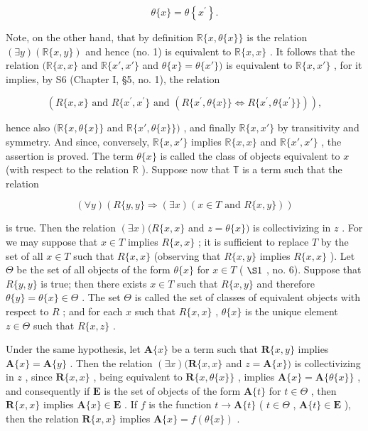\[
\theta \{x \} = \theta \left\{x ^ {\prime} \right\}.
\]

Note, on the other hand, that by definition \(\mathbb{R}\{x, \theta\{x\}\}\) is the relation \((\exists y)(\mathbb{R}\{x, y\})\) and hence (no. 1) is equivalent to \(\mathbb{R}\{x, x\}\) . It follows that the relation \((\mathbb{R}\{x, x\}\) and \(\mathbb{R}\{x', x'\}\) and \(\theta\{x\} = \theta\{x'\})\) is equivalent to \(\mathbb{R}\{x, x'\}\) , for it implies, by S6 (Chapter I, §5, no. 1), the relation

\[
(R \{x, x \} \text {   and   } R \{x ^ {\prime}, x ^ {\prime} \} \text {   and   } (R \{x ^ {\prime}, \theta \{x \} \} \iff R \{x ^ {\prime}, \theta \{x ^ {\prime} \} \})),
\]

hence also \((\mathbb{R}\{x, \theta\{x\}\}\) and \(\mathbb{R}\{x', \theta\{x\}\})\) , and finally \(\mathbb{R}\{x, x'\}\) by transitivity and symmetry. And since, conversely, \(\mathbb{R}\{x, x'\}\) implies \(\mathbb{R}\{x, x\}\) and \(\mathbb{R}\{x', x'\}\) , the assertion is proved. The term \(\theta\{x\}\) is called the class of objects equivalent to \(x\) (with respect to the relation \(\mathbb{R}\) ). Suppose now that \(\mathbb{T}\) is a term such that the relation

\[
(\forall y) (R \{y, y \} \Longrightarrow (\exists x) (x \in T \text {   and   } R \{x, y \}))\tag{1}
\]

is true. Then the relation \((\exists x)(R\{x, x\}\) and \(z = \theta\{x\})\) is collectivizing in \(z\) . For we may suppose that \(x \in T\) implies \(R\{x, x\}\) ; it is sufficient to replace \(T\) by the set of all \(x \in T\) such that \(R\{x, x\}\) (observing that \(R\{x, y\}\) implies \(R\{x, x\}\) ). Let \(\Theta\) be the set of all objects of the form \(\theta\{x\}\) for \(x \in T\) ( \(\S 1\) , no. 6). Suppose that \(R\{y, y\}\) is true; then there exists \(x \in T\) such that \(R\{x, y\}\) and therefore \(\theta\{y\} = \theta\{x\} \in \Theta\) . The set \(\Theta\) is called the set of classes of equivalent objects with respect to \(R\) ; and for each \(x\) such that \(R\{x, x\}\) , \(\theta\{x\}\) is the unique element \(z \in \Theta\) such that \(R\{x, z\}\) .

Under the same hypothesis, let \(\mathbf{A}\{x\}\) be a term such that \(\mathbf{R}\{x,y\}\) implies \(\mathbf{A}\{x\} = \mathbf{A}\{y\}\) . Then the relation \((\exists x)(\mathbf{R}\{x,x\}\) and \(z = \mathbf{A}\{x\})\) is collectivizing in \(z\) , since \(\mathbf{R}\{x,x\}\) , being equivalent to \(\mathbf{R}\{x,\theta\{x\}\}\) , implies \(\mathbf{A}\{x\} = \mathbf{A}\{\theta\{x\}\}\) , and consequently if \(\mathbf{E}\) is the set of objects of the form \(\mathbf{A}\{t\}\) for \(t \in \Theta\) , then \(\mathbf{R}\{x,x\}\) implies \(\mathbf{A}\{x\} \in \mathbf{E}\) . If \(f\) is the function \(t \to \mathbf{A}\{t\}\) ( \(t \in \Theta\) , \(\mathbf{A}\{t\} \in \mathbf{E}\) ), then the relation \(\mathbf{R}\{x,x\}\) implies \(\mathbf{A}\{x\} = f(\theta\{x\})\) .

